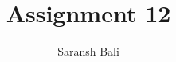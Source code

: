 \documentclass[journal,12pt,twocolumn]{IEEEtran}
\begin{document}
	\makeatletter
	\makeatother
	\let\StandardTheFigure\thefigure
	\let\vec\mathbf
	\renewcommand{\thefigure}{\theproblem}
	\def\putbox#1#2#3{\makebox[0in][l]{\makebox[#1][l]{}\raisebox{\baselineskip}[0in][0in]{\raisebox{#2}[0in][0in]{#3}}}}
	\def\rightbox#1{\makebox[0in][r]{#1}}
	\def\centbox#1{\makebox[0in]{#1}}
	\def\topbox#1{\raisebox{-\baselineskip}[0in][0in]{#1}}
	\def\midbox#1{\raisebox{-0.5\baselineskip}[0in][0in]{#1}}
	\vspace{3cm}
	\title{Assignment 12}
	\author{Saransh Bali}
\end{document}
